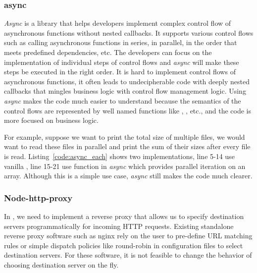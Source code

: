 \subsubsection{async}
\emph{Async} is a library that helps developers implement complex control flow of asynchronous 
functions without nested callbacks. 
It supports various control flows such as calling asynchronous functions in
series, in parallel, in the order that meets predefined dependencies, etc.
The developers can focus on the implementation of individual steps
of control flows and \emph{async} will make these steps be executed in the right order.
It is hard to implement control flows of asynchronous functions, 
it often leads to undecipherable code with deeply nested callbacks that
mingles business logic with control flow management logic.
Using \emph{async} makes the code
much easier to understand because the semantics of the control flows are represented
by well named functions like , , etc., and the code is more
focused on business logic. 


For example, suppose we want to print the total size of multiple files,
we would want to read these files in parallel and print the sum of their sizes
after every file is read. Listing~\ref{code:async_each} shows two implementations,
line 5-14 use vanilla \js, line 15-21 use  function in \emph{async}
which provides parallel iteration on an array. Although this is a 
simple use case, \emph{async} still makes the code much clearer.



\subsubsection{Node-http-proxy}

In \cbtwo, we need to implement a reverse proxy that allows us to specify
destination servers programmatically for incoming HTTP requests.
Existing standalone reverse proxy software such as nginx 
rely on the user to pre-define
URL matching rules or simple dispatch policies like round-robin in configuration
files to select destination servers.
For these software, it is not feasible to change the behavior of choosing destination server
on the fly.

